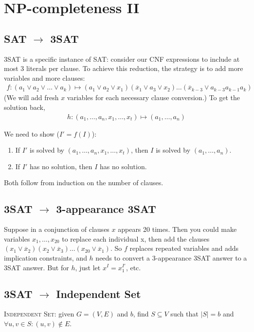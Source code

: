 \chapter{NP-completeness II}
\section{SAT \(\to\) 3SAT}
3SAT is a specific instance of SAT: consider our CNF expressions to include
at most 3 literals per clause.
To achieve this reduction, the strategy is to add more variables and more 
clauses:
\begin{align*}
	f: \left(a_1 \lor a_2 \lor \ldots \lor a_k\right)
	\mapsto \left(a_1 \lor a_2 \lor x_1 \right)
		\left(\overline{x}_1 \lor a_3 \lor x_2 \right)
		\ldots
		\left(\overline{x}_{k - 3} \lor a_{k - 3} a_{k - 1} a_{k}\right)
\end{align*}
(We will add fresh \(x\) variables for each necessary clause conversion.) To get the solution back,
\begin{align*}
	h: \left(a_1,\ldots, a_n, x_1, \ldots, x_t\right)\mapsto
	\left(a_1,\ldots, a_n\right)
\end{align*}

We need to show (\(I' = f(I)\)):
\begin{enumerate}
	\item If \(I'\) is solved by \(\left(a_1,\ldots, a_n, x_1, \ldots, x_t\right)\), then \(I\) is solved by \(\left(a_1,\ldots, a_n\right)\).
	
	\item If \(I'\) has no solution, then \(I\) has no solution.
\end{enumerate}
Both follow from induction on the number of clauses.

\section{3SAT \(\to\) 3-appearance 3SAT}
Suppose in a conjunction of clauses \(x\) appears 20 times.
Then you could make variables \(x_1,\ldots,x_{20}\) to replace each individual x,
then add the clauses \(\left(x_1 \lor \overline{x}_2\right)\left(x_2 \lor \overline{x}_3\right)\ldots \left(x_{20} \lor \overline{x}_1\right)\). So \(f\) replaces repeated variables and adds implication constraints, and \(h\) needs to convert a 3-appearance 3SAT answer to a 3SAT answer. But for \(h\), just let \(x^I = x^{I'}_1\), etc.

\section{3SAT \(\to\) Independent Set}
\textsc{Independent Set}: given \(G = (V, E)\) and \(b\), find \(S\subseteq V\) such that \(\left|S\right| = b\) and \(\forall u,v \in S: \left(u,v\right) \not\in E\).


